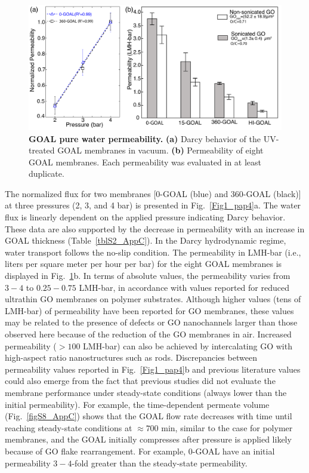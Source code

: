 \begin{figure}[h!]
  \centering
  \includegraphics[width=6in]{paper4/Fig4.pdf}
  \caption{\textbf{GOAL pure water permeability.} \textbf{(a)} Darcy behavior of the UV-treated GOAL membranes in vacuum. \textbf{(b)} Permeability of eight GOAL membranes. Each permeability was evaluated in at least duplicate.}
  \label{Fig4_pap4}
\end{figure}
The normalized flux for two membranes [0-GOAL (blue) and 360-GOAL (black)] at three pressures (2, 3, and 4 bar) is presented in Fig.~\ref{Fig1_pap4}a. The water flux is linearly dependent on the applied pressure indicating Darcy behavior. These data are also supported by the decrease in permeability with an increase in GOAL thickness (Table~\ref{tblS2_AppC}). In the Darcy hydrodynamic regime, water transport follows the no-slip condition.\cite{thomas2009water,suk2010water} The permeability in LMH-bar (i.e., liters per square meter per hour per bar) for the eight GOAL membranes is displayed in Fig.~\ref{Fig4_pap4}b. In terms of absolute values, the permeability varies from $3-4$ to $0.25-0.75$ LMH-bar, in accordance with values reported for reduced ultrathin GO membranes on polymer substrates.\cite{han2013ultrathin,Hu2013,hu2016organic,hu2014layer} Although higher values (tens of LMH-bar) of permeability have been reported for GO membranes, these values may be related to the presence of defects or GO nanochannels larger than those observed here because of the reduction of the GO membranes in air.\cite{xia2015ultrathin,qiu2011controllable} Increased permeability ($>100$ LMH-bar) can also be achieved by intercalating GO with high-aspect ratio nanostructures such as rods.\cite{goh2015all,huang2013ultrafast} Discrepancies between permeability values reported in Fig.~\ref{Fig1_pap4}b and previous literature values could also emerge from the fact that previous studies did not evaluate the membrane performance under steady-state conditions (always lower than the initial permeability).\cite{amadei2016increase} For example, the time-dependent permeate volume (Fig.~\ref{figS8_AppC}) shows that the GOAL flow rate decreases with time until reaching steady-state conditions at $\approx700$ min, similar to the case for polymer membranes, and the GOAL initially compresses after pressure is applied likely because of GO flake rearrangement.\cite{huang2013ultrafast,huang2013salt} For example, 0-GOAL have an initial permeability $3-4$-fold greater than the steady-state permeability.\\
